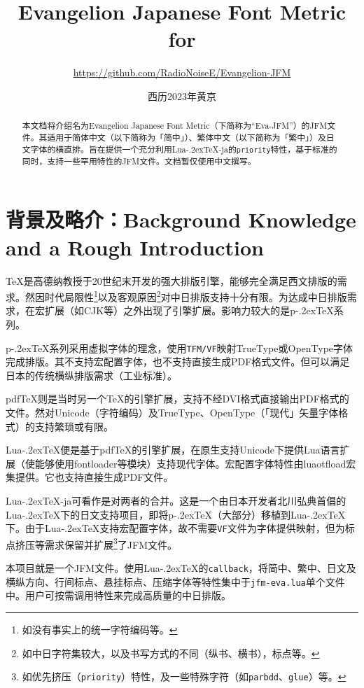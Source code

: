 \documentclass{ltjsarticle}
\title{\sffamily\bfseries Evangelion Japanese Font Metric for \LuaTeX}
\author{\large \url{https://github.com/RadioNoiseE/Evangelion-JFM}}
\date{西历2023年\quad{}黄京}
\def\段{\par}
\def\LuaTeX{Lua\kern-.2ex\TeX}
\def\pTeX{p\kern-.2ex\TeX}
\def\pdfTeX{pdf\TeX}
\begin{document}
\zw\parskip=2pt

\maketitle

\begin{abstract}
    本文档将介绍名为Evangelion Japanese Font Metric（下简称为``\textsf{Eva-JFM}''）的JFM文件。其适用于简体中文（以下简称为「简中」）、繁体中文（以下简称为「繁中」）及日文字体的横直排。旨在提供一个充分利用\LuaTeX{}-ja的\texttt{priority}特性，基于标准\cite{jlreq}的同时，支持一些罕用特性的JFM文件。文档暂仅使用中文撰写。\段
\end{abstract}

\section{背景及略介：Background Knowledge and a Rough Introduction}
\TeX{}是高德纳教授于20世纪末开发的强大排版引擎，能够完全满足西文排版的需求。然因时代局限性\footnote{如没有事实上的统一字符编码等。}以及客观原因\footnote{如中日字符集较大，以及书写方式的不同（纵书、横书），标点等。}对中日排版支持十分有限。为达成中日排版需求，在宏扩展（如\textsf{CJK}等）之外出现了引擎扩展。影响力较大的是\pTeX{}系列。\段
\pTeX{}系列采用虚拟字体的理念，使用\texttt{TFM/VF}映射TrueType或OpenType字体完成排版。其不支持宏配置字体，也不支持直接生成PDF格式文件。但可以满足日本的传统横纵排版需求（工业标准）。\段
\pdfTeX{}则是当时另一个\TeX{}的引擎扩展，支持不经DVI格式直接输出PDF格式的文件。然对Unicode（字符编码）及TrueType、OpenType（「现代」矢量字体格式）的支持繁琐或有限。\段
\LuaTeX{}便是基于\pdfTeX{}的引擎扩展，在原生支持Unicode下提供Lua语言扩展（使能够使用\textsf{fontloader}等模块）支持现代字体。宏配置字体特性由\textsf{luaotfload}宏集提供。它也支持直接生成PDF文件。\段
\LuaTeX{}-ja可看作是对两者的合并。这是一个由日本开发者北川弘典首倡的\LuaTeX{}下的日文支持项目，即将\pTeX{}（大部分）移植到\LuaTeX{}下。由于\LuaTeX{}支持宏配置字体，故不需要\texttt{VF}文件为字体提供映射，但为标点挤压等需求保留并扩展\footnote{如优先挤压（\texttt{priority}）特性，及一些特殊字符（如\texttt{parbdd}、\texttt{glue}）等。}了JFM文件。\段
本项目就是一个JFM文件。使用\LuaTeX{}的\texttt{callback}，将简中、繁中、日文及横纵方向、行间标点、悬挂标点、压缩字体等特性集中于\texttt{jfm-eva.lua}单个文件中。用户可按需调用特性来完成高质量的中日排版。
\end{document}
